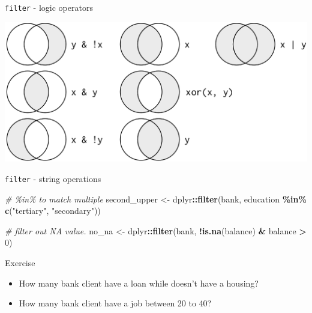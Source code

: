 \documentclass[
  10pt,
  ignorenonframetext,
  serif]{beamer}
\newenvironment{Shaded}{\begin{snugshade}}{\end{snugshade}}
\newcommand{\CommentTok}[1]{\textcolor[rgb]{0.56,0.35,0.01}{\textit{#1}}}
\newcommand{\DecValTok}[1]{\textcolor[rgb]{0.00,0.00,0.81}{#1}}
\newcommand{\KeywordTok}[1]{\textcolor[rgb]{0.13,0.29,0.53}{\textbf{#1}}}
\newcommand{\NormalTok}[1]{#1}
\newcommand{\OperatorTok}[1]{\textcolor[rgb]{0.81,0.36,0.00}{\textbf{#1}}}
\newcommand{\StringTok}[1]{\textcolor[rgb]{0.31,0.60,0.02}{#1}}
\providecommand{\tightlist}{%
  \setlength{\itemsep}{0pt}\setlength{\parskip}{0pt}}
\begin{document}
\begin{frame}{\texttt{filter} - logic operators}
\protect\hypertarget{filter---logic-operators}{}
\begin{center}\includegraphics[width=0.75\linewidth]{imgs/2017/transform-logical} \end{center}
\end{frame}

\begin{frame}[fragile]{\texttt{filter} - string operations}
\protect\hypertarget{filter---string-operations}{}
\begin{Shaded}
\begin{Highlighting}[]
\CommentTok{\# \%in\% to match multiple}
\NormalTok{second\_upper \textless{}{-}}\StringTok{ }\NormalTok{dplyr}\OperatorTok{::}\KeywordTok{filter}\NormalTok{(bank, education }\OperatorTok{\%in\%}\StringTok{ }\KeywordTok{c}\NormalTok{(}\StringTok{"tertiary"}\NormalTok{, }\StringTok{"secondary"}\NormalTok{))}

\CommentTok{\# filter out NA value.}
\NormalTok{no\_na \textless{}{-}}\StringTok{ }\NormalTok{dplyr}\OperatorTok{::}\KeywordTok{filter}\NormalTok{(bank, }\OperatorTok{!}\KeywordTok{is.na}\NormalTok{(balance) }\OperatorTok{\&}\StringTok{ }\NormalTok{balance }\OperatorTok{\textgreater{}}\StringTok{ }\DecValTok{0}\NormalTok{)}
\end{Highlighting}
\end{Shaded}
\end{frame}

\begin{frame}{Exercise}
\protect\hypertarget{exercise}{}
\begin{itemize}
\tightlist
\item
  How many bank client have a loan while doesn't have a housing?
\item
  How many bank client have a job between 20 to 40?
\end{itemize}
\end{frame}
\end{document}
